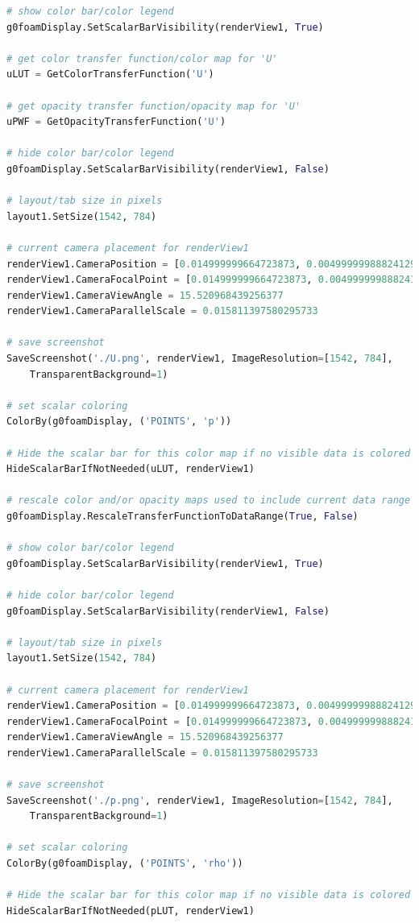 \documentclass[12pt]{article}
\begin{document}
\begin{lstlisting}[language=python, caption=Script for the generation of images and data from the CFD results., label=lst:ppost]
# show color bar/color legend
g0foamDisplay.SetScalarBarVisibility(renderView1, True)

# get color transfer function/color map for 'U'
uLUT = GetColorTransferFunction('U')

# get opacity transfer function/opacity map for 'U'
uPWF = GetOpacityTransferFunction('U')

# hide color bar/color legend
g0foamDisplay.SetScalarBarVisibility(renderView1, False)

# layout/tab size in pixels
layout1.SetSize(1542, 784)

# current camera placement for renderView1
renderView1.CameraPosition = [0.014999999664723873, 0.004999999888241291, 0.06109054909012853]
renderView1.CameraFocalPoint = [0.014999999664723873, 0.004999999888241291, 0.0]
renderView1.CameraViewAngle = 15.520968439256377
renderView1.CameraParallelScale = 0.015811397580295733

# save screenshot
SaveScreenshot('./U.png', renderView1, ImageResolution=[1542, 784],
    TransparentBackground=1)

# set scalar coloring
ColorBy(g0foamDisplay, ('POINTS', 'p'))

# Hide the scalar bar for this color map if no visible data is colored by it.
HideScalarBarIfNotNeeded(uLUT, renderView1)

# rescale color and/or opacity maps used to include current data range
g0foamDisplay.RescaleTransferFunctionToDataRange(True, False)

# show color bar/color legend
g0foamDisplay.SetScalarBarVisibility(renderView1, True)

# hide color bar/color legend
g0foamDisplay.SetScalarBarVisibility(renderView1, False)

# layout/tab size in pixels
layout1.SetSize(1542, 784)

# current camera placement for renderView1
renderView1.CameraPosition = [0.014999999664723873, 0.004999999888241291, 0.06109054909012853]
renderView1.CameraFocalPoint = [0.014999999664723873, 0.004999999888241291, 0.0]
renderView1.CameraViewAngle = 15.520968439256377
renderView1.CameraParallelScale = 0.015811397580295733

# save screenshot
SaveScreenshot('./p.png', renderView1, ImageResolution=[1542, 784],
    TransparentBackground=1)

# set scalar coloring
ColorBy(g0foamDisplay, ('POINTS', 'rho'))

# Hide the scalar bar for this color map if no visible data is colored by it.
HideScalarBarIfNotNeeded(pLUT, renderView1)


\end{lstlisting}
\end{document}
